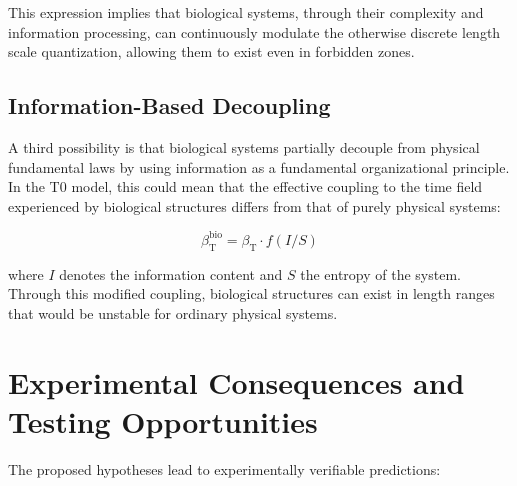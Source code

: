 \documentclass[12pt,a4paper]{article}
\newcommand{\betaT}{\beta_{\text{T}}}
\begin{document}
	This expression implies that biological systems, through their complexity and information processing, can continuously modulate the otherwise discrete length scale quantization, allowing them to exist even in forbidden zones.
	
	\subsection{Information-Based Decoupling}
	\label{subsec:informationsbasierte_entkopplung}
	
	A third possibility is that biological systems partially decouple from physical fundamental laws by using information as a fundamental organizational principle. In the T0 model, this could mean that the effective coupling to the time field experienced by biological structures differs from that of purely physical systems:
	
	\begin{equation}
		\betaT^{\text{bio}} = \betaT \cdot f(I/S)
	\end{equation}
	
	where $I$ denotes the information content and $S$ the entropy of the system. Through this modified coupling, biological structures can exist in length ranges that would be unstable for ordinary physical systems.
	
	\section{Experimental Consequences and Testing Opportunities}
	\label{sec:experimentelle_konsequenzen}
	
	The proposed hypotheses lead to experimentally verifiable predictions:
	
\end{document}
